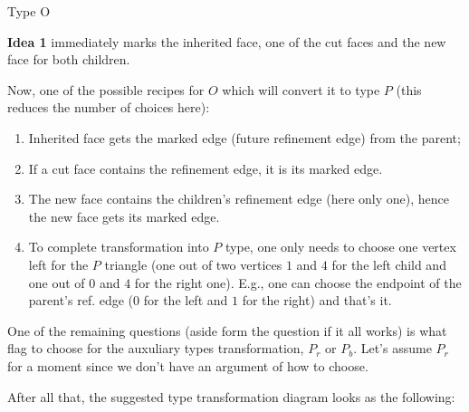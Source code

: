 \documentclass[a4paper,12pt]{amsart}
\numberwithin{equation}{section}
\begin{document}
\begin{itemize}
\begin{center}
\begin{tikzpicture}
\end{tikzpicture}
Type O    
\end{center}
    
    \textbf{Idea 1} immediately marks the inherited face, one of the cut faces and the new face for both children.
    
    Now, one of the possible recipes for $O$ which will convert it to type $P$ (this reduces the number of choices here):
    	\begin{enumerate}
		\item Inherited face gets the marked edge (future refinement edge) from the parent;
		\item If a cut face contains the refinement edge, it is its marked edge.
		\item The new face contains the children's refinement edge (here only one), hence the new face gets its marked edge.
		\item To complete transformation into $P$ type, one only needs to choose one vertex left for the $P$ triangle (one out of two vertices $1$ and $4$ for the left child and one out of $0$ and $4$ for the right one). E.g., one can choose the endpoint of the parent's ref. edge ($0$ for the left and $1$ for the right) and that's it.
	\end{enumerate}	
	
\end{itemize}

One of the remaining questions (aside form the question if it all works) is what flag to choose for the auxuliary types transformation, $P_r$ or $P_b$. Let's assume $P_r$ for a moment since we don't have an argument of how to choose.

After all that, the suggested type transformation diagram looks as the following:
\end{document}
